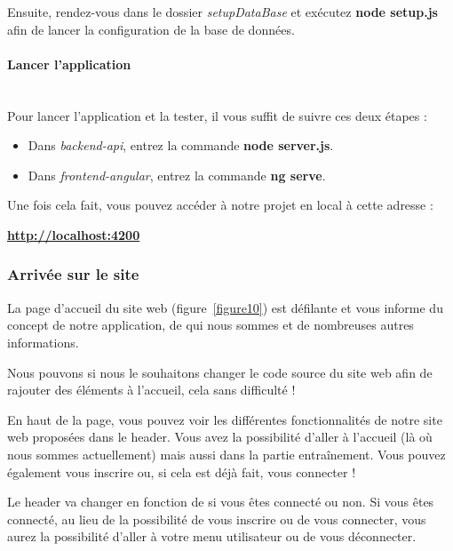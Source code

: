 \documentclass[12pt,french]{article}
\begin{document}
\bigskip

Ensuite, rendez-vous dans le dossier \textit{setupDataBase} et exécutez \textbf{node setup.js} afin de lancer la configuration de la base de données.

\paragraph{Lancer l'application \\\\}

Pour lancer l'application et la tester, il vous suffit de suivre ces deux étapes :

\begin{itemize}
	\item Dans \textit{backend-api}, entrez la commande \textbf{node server.js}.
	\item Dans \textit{frontend-angular}, entrez la commande \textbf{ng serve}.
\end{itemize}

Une fois cela fait, vous pouvez accéder à notre projet en local à cette adresse :

\textbf{\href{http://localhost:4200}{http://localhost:4200}}

\subsubsection{Arrivée sur le site}

La page d'accueil du site web (figure~\ref{figure10}) est défilante et vous informe du concept de notre application, de qui nous sommes et de nombreuses autres informations.

Nous pouvons si nous le souhaitons changer le code source du site web afin de rajouter des éléments à l'accueil, cela sans difficulté !

\bigskip

En haut de la page, vous pouvez voir les différentes fonctionnalités de notre site web proposées dans le \gls{header}. Vous avez la possibilité d'aller à l'accueil (là où nous sommes actuellement) mais aussi dans la partie entraînement. Vous pouvez également vous inscrire ou, si cela est déjà fait, vous connecter !

Le \gls{header} va changer en fonction de si vous êtes connecté ou non. Si vous êtes connecté, au lieu de la possibilité de vous inscrire ou de vous connecter, vous aurez la possibilité d'aller à votre menu utilisateur ou de vous déconnecter.
\end{document}
